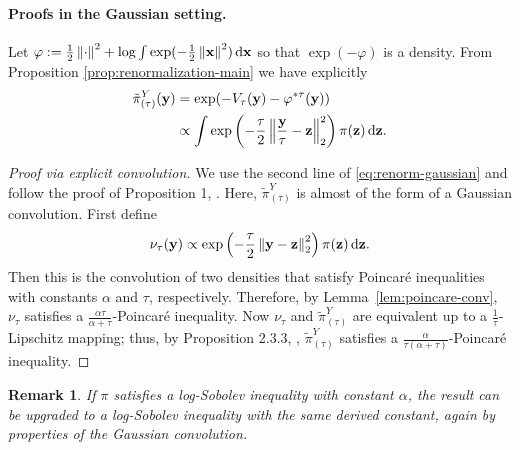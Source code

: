 \documentclass[11pt]{article}
\newtheorem{remark}{Remark}
\newcommand{\norm}[1]{\left\lVert#1\right\rVert}
\newcommand{\dd}{\textup{d}}
\newcommand{\Par}[1]{\left(#1\right)}
\newcommand{\0}{\mathbf{0}}
\newcommand{\1}{\mathbf{1}}
\newcommand{\vx}{\mathbf{x}}
\newcommand{\vy}{\mathbf{y}}
\newcommand{\vz}{\mathbf{z}}
\newcommand{\vhi}{\varphi}
\newcommand{\tpi}{\tilde{\pi}}
\begin{document}
\paragraph{Proofs in the Gaussian setting.}
Let $\vhi:=\frac{1}{2}\norm{\cdot}^2+\log \int \exp(-\frac{1}{2}\norm{\vx}^2)\,\dd\vx$ so that $\exp(-\vhi)$ is a density.  From Proposition \ref{prop:renormalization-main} we have explicitly
\begin{equation}\label{eq:renorm-gaussian}
    \begin{aligned}
        \tpi_{(\tau)}^Y(\vy)
        &=\exp(-V_\tau(\vy)-\vhi^{*\tau}(\vy))\\
        &\propto \int \exp\Par{-\frac{\tau}{2}\norm{\frac{\vy}{\tau}-\vz}_2^2}\pi(\vz)\,\dd\vz.
    \end{aligned}
\end{equation}

\begin{proof}[Proof via explicit convolution]
    We use the second line of \eqref{eq:renorm-gaussian} and follow the proof of Proposition 1, \cite{ShiTZ25}.  Here, $\tpi_{(\tau)}^Y$ is almost of the form of a Gaussian convolution.  First define
    \[\nu_\tau(\vy)\propto \exp\Par{-\frac{\tau}{2}\norm{\vy-\vz}_2^2}\pi(\vz)\,\dd\vz.\]
    Then this is the convolution of two densities that satisfy Poincar\'e inequalities with constants $\alpha$ and $\tau$, respectively. Therefore, by Lemma~\ref{lem:poincare-conv}, $\nu_\tau$ satisfies a $\frac{\alpha\tau}{\alpha+\tau}$-Poincar\'e inequality.  Now $\nu_\tau$ and $\tpi_{(\tau)}^Y$ are equivalent up to a $\frac{1}{\tau}$-Lipschitz mapping; thus, by Proposition 2.3.3, \cite{Chewi23}, $\tpi_{(\tau)}^Y$ satisfies a $\frac{\alpha}{\tau(\alpha+\tau)}$-Poincar\'e inequality.
\end{proof}
\begin{remark}
    If $\pi$ satisfies a log-Sobolev inequality with constant $\alpha$, the result can be upgraded to a log-Sobolev inequality with the same derived constant, again by properties of the Gaussian convolution.
\end{remark}
\end{document}
